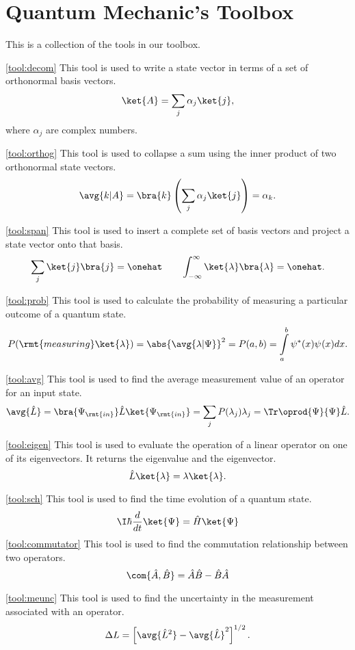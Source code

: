 


\chapter*{Quantum Mechanic's Toolbox}
This is a collection of the tools in our toolbox.

\ref{tool:decom} This tool is used to write a state vector in terms of a set of orthonormal basis vectors.
\[
\ket{A} = \sum_j \alpha_j \ket{j},
\]
where $\alpha_j$ are complex numbers.

\ref{tool:orthog} This tool is used to collapse a sum using the inner product of two orthonormal state vectors.
\[
\avg{k|A} = \bra{k} \left( \sum_j \alpha_j \ket{j} \right)= \alpha_k.
\]

\ref{tool:span} This tool is used to insert a complete set of basis vectors and project a state vector onto that basis.
\[
\sum_j \ket{j}\bra{j} = \onehat \qquad \int_{-\infty}^{\infty} \ket{\lambda}\bra{\lambda} = \onehat. 
\]

\ref{tool:prob} This tool is used to calculate the probability of measuring a particular outcome of a quantum state.
\[
P(\rmt{measuring } \ket{\lambda}) = \abs{\avg{\lambda|\Psi}}^2 = P(a,b) = \int\displaylimits_a^b\psi^{*}(x)\psi^{}(x)dx.
\]

\ref{tool:avg} This tool is used to find the average measurement value of an operator for an input state.
\[
\avg{\hat{L}} = \bra{\Psi_\rmt{in}}\hat{L}\ket{\Psi_\rmt{in}} =  \sum_j P(\lambda_j)\lambda_j = \Tr \oprod{\Psi}{\Psi}\hat{L}.
\]

\ref{tool:eigen} This tool is used to evaluate the operation of a linear operator on one of its eigenvectors. It returns the eigenvalue and the eigenvector.
\[
\hat{L}\ket{\lambda} = \lambda\ket{\lambda}.
\]

\ref{tool:sch} This tool is used to find the time evolution of a quantum state.
\[
\I \hbar \frac {d}{dt}\ket{\Psi} = \hat{H}\ket{\Psi}
\]
\ref{tool:commutator} This tool is used to find the commutation relationship between two operators.
\[
\com{\hat{A},\hat{B}}=\hat{A}\hat{B} - \hat{B}\hat{A}
\]

\ref{tool:meunc} This tool is used to find the uncertainty in the measurement associated with an operator.
\[
\Delta L= \left[\avg{\hat{L}^2} - \avg{\hat{L}}^2\right]^{1/2}.
\]

